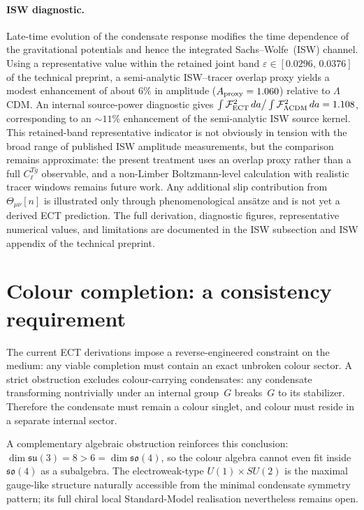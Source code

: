 \documentclass[11pt,a4paper]{article}
\begin{document}
\paragraph{ISW diagnostic.}
Late-time evolution of the condensate response modifies the time
dependence of the gravitational potentials and hence the integrated
Sachs--Wolfe~(ISW) channel.
Using a representative value within the retained joint band
$\varepsilon \in [0.0296,\,0.0376]$ of the technical preprint, a semi-analytic ISW--tracer overlap proxy
yields a modest enhancement of about $6\%$ in amplitude
($A_{\rm proxy}=1.060$) relative to $\Lambda$CDM\@.
An internal source-power diagnostic gives
$\int \mathcal{F}_{\rm ECT}^2\,da \big/ \int \mathcal{F}_{\Lambda{\rm CDM}}^2\,da
= 1.108$, corresponding to an $\sim 11\%$ enhancement of the
semi-analytic ISW source kernel.
This retained-band representative indicator is not obviously in
tension with the broad range of published ISW amplitude measurements,
but the comparison remains approximate: the present treatment uses an
overlap proxy rather than a full $C_\ell^{Tg}$ observable, and a
non-Limber Boltzmann-level calculation with realistic tracer windows
remains future work.
Any additional slip contribution from $\Theta_{\mu\nu}[n]$ is
illustrated only through phenomenological ans\"atze and is not
yet a derived ECT prediction.
The full derivation, diagnostic figures, representative numerical values, and
limitations are documented in the ISW subsection and ISW appendix
of the technical preprint.

\section{Colour completion: a consistency requirement}
\label{sec:pop_colour}

The current ECT derivations impose a reverse-engineered constraint on the medium: any viable completion must contain an exact unbroken colour sector. A strict obstruction excludes colour-carrying condensates: any condensate transforming nontrivially under an internal group~$G$ breaks~$G$ to its stabilizer. Therefore the condensate must remain a colour singlet, and colour must reside in a separate internal sector.

A complementary algebraic obstruction reinforces this conclusion: $\dim \mathfrak{su}(3) = 8 > 6 = \dim \mathfrak{so}(4)$, so the colour algebra cannot even fit inside $\mathfrak{so}(4)$ as a subalgebra. The electroweak-type $U(1)\times SU(2)$ is the maximal gauge-like structure naturally accessible from the minimal condensate symmetry pattern; its full chiral local Standard-Model realisation nevertheless remains open.
\end{document}
